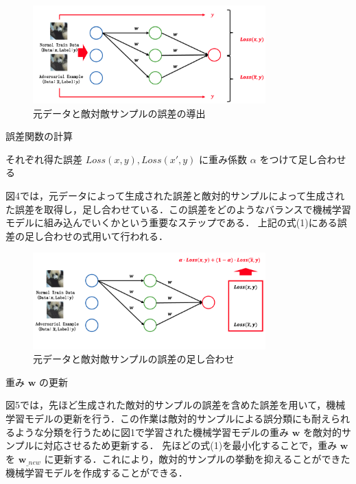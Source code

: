 \begin{algorithm_step}
    \begin{figure}[H]
        \centering
        \includegraphics[width=0.8\textwidth]{images/敵対的学習2.png}
        \caption{元データと敵対敵サンプルの誤差の導出}
        \label{fig:adversarial_learning2}
    \end{figure}

    \item[Step 3)] 誤差関数の計算
    
    それぞれ得た誤差 $Loss(x, y), Loss(x', y)$ に重み係数 $\alpha$ をつけて足し合わせる

    図4では，元データによって生成された誤差と敵対的サンプルによって生成された誤差を取得し，足し合わせている．この誤差をどのようなバランスで機械学習モデルに組み込んでいくかという重要なステップである． 上記の式(1)にある誤差の足し合わせの式用いて行われる．
    
    \begin{figure}[H]
        \centering
        \includegraphics[width=0.8\textwidth]{images/敵対的学習3.png}
        \caption{元データと敵対敵サンプルの誤差の足し合わせ}
        \label{fig:adversarial_learning3}
    \end{figure}

    \item[Step 4)] 重み $\bm{w}$ の更新

    図5では，先ほど生成された敵対的サンプルの誤差を含めた誤差を用いて，機械学習モデルの更新を行う．この作業は敵対的サンプルによる誤分類にも耐えられるような分類を行うために図1で学習された機械学習モデルの重み $\bm{w}$ を敵対的サンプルに対応させるため更新する．
    先ほどの式(1)を最小化することで，重み $\bm{w}$ を $\bm{w}_{\_new}$ に更新する．これにより，敵対的サンプルの挙動を抑えることができた機械学習モデルを作成することができる．
    

\end{algorithm_step}
